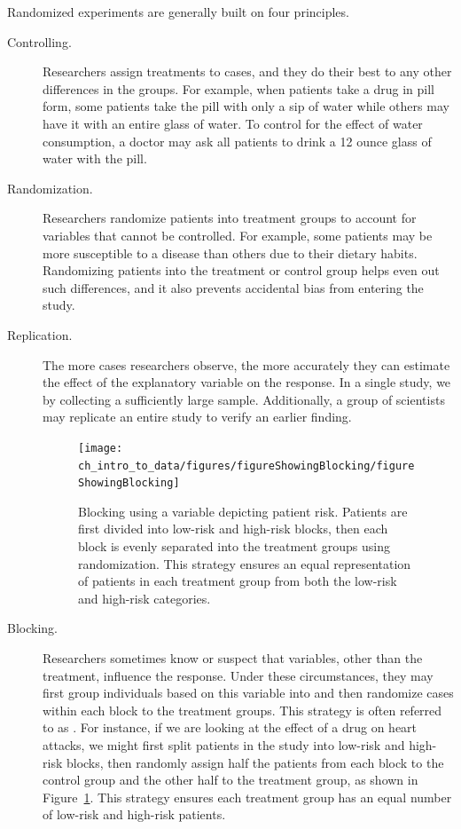 Randomized experiments are generally built on four principles.
\begin{description}
\item[Controlling.] Researchers assign treatments to cases, and they do their best to  any other differences in the groups. For example, when patients take a drug in pill form, some patients take the pill with only a sip of water while others may have it with an entire glass of water. To control for the effect of water consumption, a doctor may ask all patients to drink a 12 ounce glass of water with the pill.
\item[Randomization.] Researchers randomize patients into treatment groups to account for variables that cannot be controlled. For example, some patients may be more susceptible to a disease than others due to their dietary habits. Randomizing patients into the treatment or control group helps even out such differences, and it also prevents accidental bias from entering the study.
\item[Replication.] The more cases researchers observe, the more accurately they can estimate the effect of the explanatory variable on the response. In a single study, we  by collecting a sufficiently large sample. Additionally, a group of scientists may replicate an entire study to verify an earlier finding.

\begin{figure}
\centering
\texttt{[image: ch\_intro\_to\_data/figures/figureShowingBlocking/figureShowingBlocking]}
\caption{Blocking using a variable depicting patient risk. Patients are first divided into low-risk and high-risk blocks, then each block is evenly separated into the treatment groups using randomization. This strategy ensures an equal representation of patients in each treatment group from both the low-risk and high-risk categories.}
\label{figureShowingBlocking}
\end{figure}

\item[Blocking.] Researchers sometimes know or suspect that variables, other than the treatment, influence the response. Under these circumstances, they may first group individuals based on this variable into  and then randomize cases within each block to the treatment groups. This strategy is often referred to as . For instance, if we are looking at the effect of a drug on heart attacks, we might first split patients in the study into low-risk and high-risk blocks, then randomly assign half the patients from each block to the control group and the other half to the treatment group, as shown in Figure~\ref{figureShowingBlocking}. This strategy ensures each treatment group has an equal number of low-risk and high-risk patients.
\end{description}

